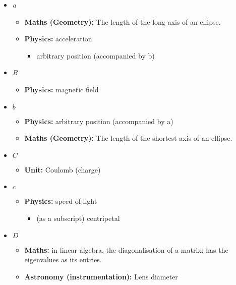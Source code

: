 \begin{itemize}
				\item \textit{a}
				\begin{itemize}
					\item\textbf{Maths (Geometry):} The length of the long axis of an ellipse.
					\item\textbf{Physics:} acceleration
					\begin{itemize}
						\item arbitrary position (accompanied by b)
					\end{itemize}
				\end{itemize}
				
				\item \textit{B}
				\begin{itemize}
					\item\textbf{Physics:} magnetic field
				\end{itemize}
				
				\item $b$
				\begin{itemize}
					\item\textbf{Physics:} arbitrary position (accompanied by a)
					\item\textbf{Maths (Geometry):} The length of the shortest axis of an ellipse.
				\end{itemize}
				
				\item $C$
				\begin{itemize}
					\item\textbf{Unit:} Coulomb (charge)
				\end{itemize}
				
				\item $c$
				\begin{itemize}
					\item\textbf{Physics:} speed of light
					\begin{itemize}
						\item (as a subscript) centripetal
					\end{itemize}
				\end{itemize}
				
				\item $D$
				\begin{itemize}
					\item\textbf{Maths:} in linear algebra, the diagonalisation of a matrix; has the eigenvalues as its entries.
					\item\textbf{Astronomy (instrumentation):} Lens diameter
				\end{itemize}
				

\end{itemize}
